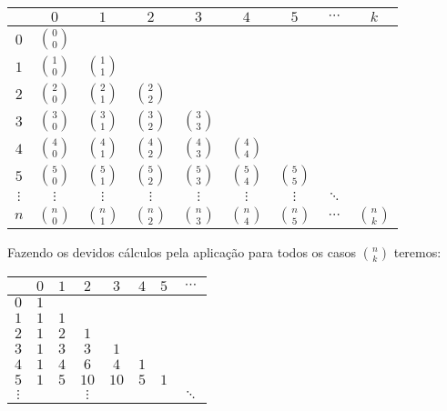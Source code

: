 \documentclass[main.tex]{subfiles}
\begin{document}
\begin{center}
\begin{tabular}{ | c | c c c c c c c c | }
\hline
   & $0$& $1$ & $2$ & $3$ & $4$ & $5$ & $\cdots$ & $k$ \\
\hline
$0$     & \tiny $0 \choose 0$ &               &               &               &               &              &         & \\
$1$     & \tiny $1 \choose 0$ & \tiny $1 \choose 1$ &               &               &               &              &         & \\
$2$     & \tiny $2 \choose 0$ & \tiny $2 \choose 1$ & \tiny $2 \choose 2$ &               &               &              &         & \\
$3$     & \tiny $3 \choose 0$ & \tiny $3 \choose 1$ & \tiny $3 \choose 2$ & \tiny $3 \choose 3$ &               &              &         & \\
$4$     & \tiny $4 \choose 0$ & \tiny $4 \choose 1$ & \tiny $4 \choose 2$ & \tiny $4 \choose 3$ & \tiny $4 \choose 4$ &              &         & \\
$5$     & \tiny $5 \choose 0$ & \tiny $5 \choose 1$ & \tiny $5 \choose 2$ & \tiny $5 \choose 3$ & \tiny $5 \choose 4$ & \tiny $5 \choose 5$&         & \\
$\vdots$&\tiny $\vdots$       &\tiny $\vdots$       &\tiny $\vdots$       &\tiny $\vdots$       &\tiny $\vdots$       &\tiny $\vdots$      &\tiny $\ddots$ & \\
$n$     & \tiny $n \choose 0$ & \tiny $n \choose 1$ & \tiny $n \choose 2$ & \tiny $n \choose 3$ & \tiny $n \choose 4$ & \tiny $n \choose 5$&\tiny $\cdots$ & \tiny $n \choose k$\\
\hline

\end{tabular}
\end{center}
Fazendo os devidos cálculos pela aplicação para todos os casos ${n \choose k}$ teremos:
\begin{center}
\begin{tabular}{ | c | c c c c c c c | }
\hline
  &$0$& $1$ & $2$ & $3$ & $4$ & $5$ & $\cdots$  \\
\hline
$0$     & $1$ &     &        &      &     &     & \\
$1$     & $1$ & $1$ &        &      &     &     & \\
$2$     & $1$ & $2$ & $1$    &      &     &     & \\
$3$     & $1$ & $3$ & $3$    & $1$  &     &     & \\
$4$     & $1$ & $4$ & $6$    & $4$  & $1$ &     & \\
$5$     & $1$ & $5$ & $10$   & $10$ & $5$ & $1$ & \\
$\vdots$&     &     &$\vdots$&      &     &     & $\ddots$ 
\end{tabular}
\end{center}
\end{document}
